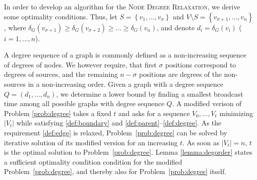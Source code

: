 
In order to develop an algorithm for the \textsc{Node Degree Relaxation}, we derive some optimality conditions.
Thus, let $S=\left\{v_1,\dots,v_{\sigma}\right\}$ and $V\setminus S=\left\{v_{\sigma+1},\ldots,v_n\right\}$, where $\delta_G(v_{\sigma+1})\geq\delta_G(v_{\sigma+2})\geq\dots\geq\delta_G(v_n)$,
and denote $d_i=\delta_G(v_i)$ ($i=1,\ldots,n$).

A degree sequence of a graph is commonly defined as a non-increasing sequence of degrees of nodes.
We however require, that first $\sigma$ positions correspond to degrees of sources, 
and the remaining $n-\sigma$ positions are degrees of the non-sources in a non-increasing order.
Given a graph with a degree sequence 
$Q=(d_1,\dots,d_n)$, we determine a lower bound by finding a smallest broadcast time among all possible graphs with degree sequence $Q$.
A modified verison of Problem \ref{prob:degree} takes a fixed $t$ and asks for a sequence $V_0,\dots,V_t$ minimizing $|V_t|$ while satisfying \ref{def:boundary} and \ref{def:parent}--\ref{def:degree}.
As the requirement \ref{def:edge} is relaxed, Problem~\ref{prob:degree} can be solved by iterative solution of its modified version for an increasing $t$.
As soon as $|V_t|=n$, $t$ is the optimal solution to Problem~\ref{prob:degree}.
Lemma \ref{lemma:degorder} states a sufficient optimality condition condition for the modified Problem~\ref{prob:degree}, and thereby also for Problem~\ref{prob:degree} itself.

